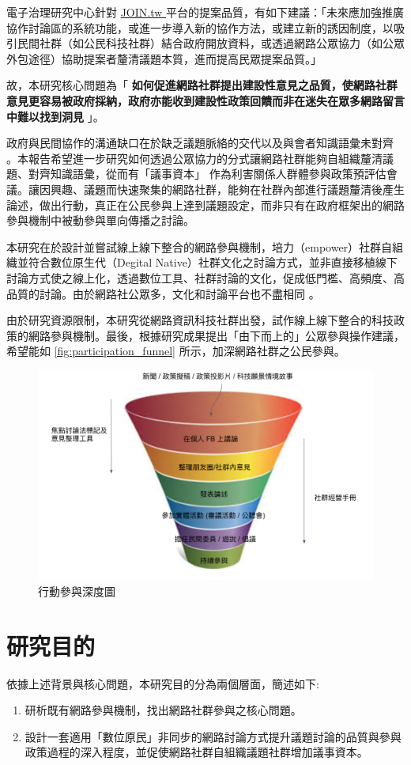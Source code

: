\documentclass[12pt,a4paper]{article}
\begin{document}
電子治理研究中心針對 \href{https://join.gov.tw}{JOIN.tw }平台的提案品質，有如下建議：「未來應加強推廣協作討論區的系統功能，或進一步導入新的協作方法，或建立新的誘因制度，以吸引民間社群（如公民科技社群）結合政府開放資料，或透過網路公眾協力（如公眾外包途徑）協助提案者釐清議題本質，進而提高民眾提案品質。」\cite{liao18}

故，本研究核心問題為「 \textbf{如何促進網路社群提出建設性意見之品質，使網路社群意見更容易被政府採納，政府亦能收到建設性政策回饋而非在迷失在眾多網路留言中難以找到洞見} 」。

政府與民間協作的溝通缺口在於缺乏議題脈絡的交代以及與會者知識語彙未對齊 \citep{alberttzeng08} 。本報告希望進一步研究如何透過公眾協力的分式讓網路社群能夠自組織釐清議題、對齊知識語彙，從而有「議事資本」 作為利害關係人群體參與政策預評估會議。讓因興趣、議題而快速聚集的網路社群，能夠在社群內部進行議題釐清後產生論述，做出行動，真正在公民參與上達到議題設定，而非只有在政府框架出的網路參與機制中被動參與單向傳播之討論。

本研究在於設計並嘗試線上線下整合的網路參與機制，培力（empower）社群自組織並符合數位原生代（Degital Native）社群文化之討論方式，並非直接移植線下討論方式使之線上化，透過數位工具、社群討論的文化，促成低門檻、高頻度、高品質的討論。由於網路社公眾多，文化和討論平台也不盡相同 。

由於研究資源限制，本研究從網路資訊科技社群出發，試作線上線下整合的科技政策的網路參與機制。最後，根據研究成果提出「由下而上的」公眾參與操作建議，希望能如 \ref{fig:participation_funnel} 所示，加深網路社群之公民參與。

\begin{figure}[htbp]
\centering
\includegraphics[width=.9\linewidth]{./images/participation_funnel.png}
\caption{\label{fig:org10ad05c}
行動參與深度圖}
\end{figure}
\section{研究目的}
\label{sec:org505933c}
依據上述背景與核心問題，本研究目的分為兩個層面，簡述如下:
\begin{enumerate}
\item 研析既有網路參與機制，找出網路社群參與之核心問題。
\item 設計一套適用「數位原民」非同步的網路討論方式提升議題討論的品質與參與政策過程的深入程度，並促使網路社群自組織議題社群增加議事資本。
\end{enumerate}
\end{document}
